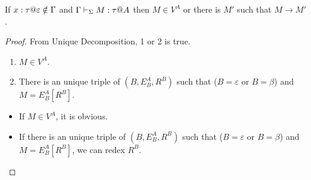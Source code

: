 \begin{corollary}[Progress]
	If $x:\tau@\varepsilon \notin \G$ and $\Gamma \vdash_\Sigma M : \tau @ A$ then $ M \in V^A $ or there is $M'$ such that $M \longrightarrow M'$.
\end{corollary}

\begin{proof}
	From Unique Decomposition, 1 or 2 is true.
	\begin{enumerate}
		\item $ M \in V^A$.
		\item There is an unique triple of $(B, E^A_B, R^B)$ such that ($B = \varepsilon$ or $B = \beta$) and $M = E^A_B[R^B]$.
	\end{enumerate}
	\begin{itemize}
		\item If $ M \in V^A$,
			it is obvious.
		\item If there is an unique triple of $(B, E^A_B, R^B)$ such that ($B = \varepsilon$ or $B = \beta$) and $M = E^A_B[R^B]$,
			we can redex $R^B$.
	\end{itemize}
\end{proof}
	
\endinput
	
	
	
	
